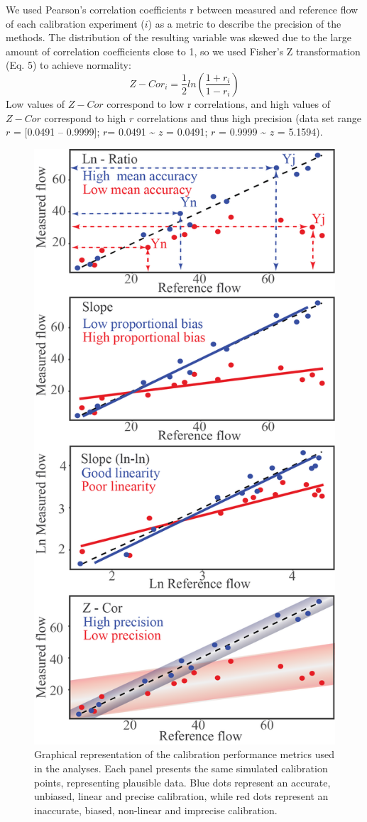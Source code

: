 \documentclass[11pt,twoside]{reedthesis}
\begin{document}
We used Pearson's correlation coefficients r between measured and
reference flow of each calibration experiment (\(i\)) as a metric to
describe the precision of the methods. The distribution of the resulting
variable was skewed due to the large amount of correlation coefficients
close to 1, so we used Fisher's Z transformation (Eq. 5) to achieve
normality:
\begin{equation}
Z-Cor_i = \frac{1}{2}ln(\frac{1+r_i}{1-r_i})
\end{equation}
Low values of \(Z-Cor\) correspond to low r correlations, and high
values of \(Z-Cor\) correspond to high \(r\) correlations and thus high
precision (data set range \(r\) = {[}0.0491 -- 0.9999{]}; \(r\)= 0.0491
\textasciitilde{} \(z\) = 0.0491; \(r\) = 0.9999 \textasciitilde{} \(z\)
= 5.1594).\par
\begin{figure}[hbt!]

{\centering \includegraphics[width=0.55\linewidth]{figure/CH2/PLOTMETRICS} 

}

\caption{Graphical representation of the calibration performance metrics used in the analyses. Each panel presents the same simulated calibration points, representing plausible data. Blue dots represent an accurate, unbiased, linear and precise calibration, while red dots represent an inaccurate, biased, non-linear and imprecise calibration.}\label{fig:ch1fig1}
\end{figure}
\end{document}
